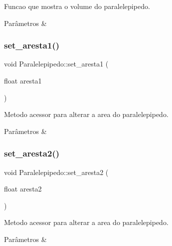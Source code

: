 Funcao que mostra o volume do paralelepipedo. 


\begin{DoxyParams}{Parâmetros}
{\em } & \\
\hline
\end{DoxyParams}
\mbox{\label{classParalelepipedo_aa4e9e622a76be557e4a38ac72e6db796}} 
\subsubsection{\texorpdfstring{set\+\_\+aresta1()}{set\_aresta1()}}
{\footnotesize\ttfamily void Paralelepipedo\+::set\+\_\+aresta1 (\begin{DoxyParamCaption}\item[{float}]{aresta1 }\end{DoxyParamCaption})}



Metodo acessor para alterar a area do paralelepipedo. 


\begin{DoxyParams}{Parâmetros}
{\em } & \\
\hline
\end{DoxyParams}
\mbox{\label{classParalelepipedo_a613fcca3e75646a03af90f642efce73d}} 
\subsubsection{\texorpdfstring{set\+\_\+aresta2()}{set\_aresta2()}}
{\footnotesize\ttfamily void Paralelepipedo\+::set\+\_\+aresta2 (\begin{DoxyParamCaption}\item[{float}]{aresta2 }\end{DoxyParamCaption})}



Metodo acessor para alterar a area do paralelepipedo. 


\begin{DoxyParams}{Parâmetros}
{\em } & \\
\hline
\end{DoxyParams}
\mbox{\label{classParalelepipedo_abf1d62c6b1fe4739a8fc9976d9c5b4f3}} 
